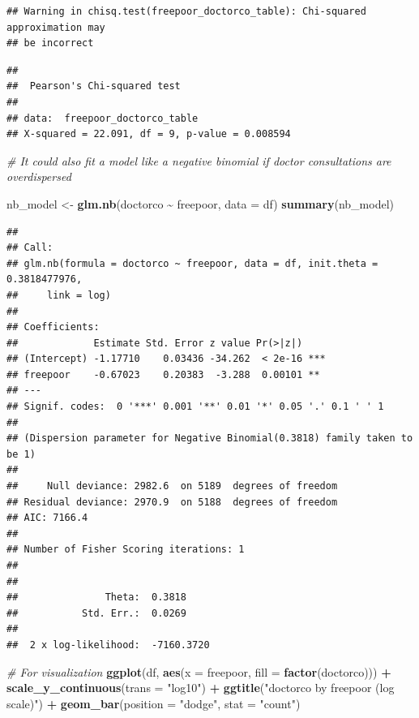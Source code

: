 \documentclass[
]{article}
\newenvironment{Shaded}{\begin{snugshade}}{\end{snugshade}}
\newcommand{\AttributeTok}[1]{\textcolor[rgb]{0.13,0.29,0.53}{#1}}
\newcommand{\CommentTok}[1]{\textcolor[rgb]{0.56,0.35,0.01}{\textit{#1}}}
\newcommand{\FunctionTok}[1]{\textcolor[rgb]{0.13,0.29,0.53}{\textbf{#1}}}
\newcommand{\NormalTok}[1]{#1}
\newcommand{\OtherTok}[1]{\textcolor[rgb]{0.56,0.35,0.01}{#1}}
\newcommand{\SpecialCharTok}[1]{\textcolor[rgb]{0.81,0.36,0.00}{\textbf{#1}}}
\newcommand{\StringTok}[1]{\textcolor[rgb]{0.31,0.60,0.02}{#1}}
\begin{document}
\begin{verbatim}
## Warning in chisq.test(freepoor_doctorco_table): Chi-squared approximation may
## be incorrect
\end{verbatim}

\begin{verbatim}
## 
##  Pearson's Chi-squared test
## 
## data:  freepoor_doctorco_table
## X-squared = 22.091, df = 9, p-value = 0.008594
\end{verbatim}

\begin{Shaded}
\begin{Highlighting}[]
\CommentTok{\# It could also fit a model like a negative binomial if doctor consultations are overdispersed}

\NormalTok{nb\_model }\OtherTok{\textless{}{-}} \FunctionTok{glm.nb}\NormalTok{(doctorco }\SpecialCharTok{\textasciitilde{}}\NormalTok{ freepoor, }\AttributeTok{data =}\NormalTok{ df)}
\FunctionTok{summary}\NormalTok{(nb\_model)}
\end{Highlighting}
\end{Shaded}

\begin{verbatim}
## 
## Call:
## glm.nb(formula = doctorco ~ freepoor, data = df, init.theta = 0.3818477976, 
##     link = log)
## 
## Coefficients:
##             Estimate Std. Error z value Pr(>|z|)    
## (Intercept) -1.17710    0.03436 -34.262  < 2e-16 ***
## freepoor    -0.67023    0.20383  -3.288  0.00101 ** 
## ---
## Signif. codes:  0 '***' 0.001 '**' 0.01 '*' 0.05 '.' 0.1 ' ' 1
## 
## (Dispersion parameter for Negative Binomial(0.3818) family taken to be 1)
## 
##     Null deviance: 2982.6  on 5189  degrees of freedom
## Residual deviance: 2970.9  on 5188  degrees of freedom
## AIC: 7166.4
## 
## Number of Fisher Scoring iterations: 1
## 
## 
##               Theta:  0.3818 
##           Std. Err.:  0.0269 
## 
##  2 x log-likelihood:  -7160.3720
\end{verbatim}

\begin{Shaded}
\begin{Highlighting}[]
\CommentTok{\# For visualization}
\FunctionTok{ggplot}\NormalTok{(df, }\FunctionTok{aes}\NormalTok{(}\AttributeTok{x =}\NormalTok{ freepoor, }\AttributeTok{fill =} \FunctionTok{factor}\NormalTok{(doctorco))) }\SpecialCharTok{+} 
  \FunctionTok{scale\_y\_continuous}\NormalTok{(}\AttributeTok{trans =} \StringTok{"log10"}\NormalTok{) }\SpecialCharTok{+}
  \FunctionTok{ggtitle}\NormalTok{(}\StringTok{"\textquotesingle{}doctorco\textquotesingle{} by \textquotesingle{}freepoor\textquotesingle{} (log scale)"}\NormalTok{) }\SpecialCharTok{+}
  \FunctionTok{geom\_bar}\NormalTok{(}\AttributeTok{position =} \StringTok{"dodge"}\NormalTok{, }\AttributeTok{stat =} \StringTok{"count"}\NormalTok{)}
\end{Highlighting}
\end{Shaded}
\end{document}

